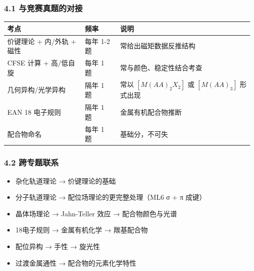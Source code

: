 \documentclass[a4paper,11pt]{ctexart}
\providecommand{\tightlist}{\setlength{\itemsep}{0pt}\setlength{\parskip}{0pt}}
\newcounter{none}
\begin{document}
\subsubsection{4.1 与竞赛真题的对接}\label{ux4e0eux7adeux8d5bux771fux9898ux7684ux5bf9ux63a5}

{\def\LTcaptype{none} %
\begin{longtable}[]{@{}
  >{\raggedright\arraybackslash}p{}
  >{\centering\arraybackslash}p{}
  >{\raggedright\arraybackslash}p{}@{}}
\toprule\noalign{}
\begin{minipage}[b]{\linewidth}\raggedright
考点
\end{minipage} & \begin{minipage}[b]{\linewidth}\centering
频率
\end{minipage} & \begin{minipage}[b]{\linewidth}\raggedright
说明
\end{minipage} \\
\midrule\noalign{}
\endhead
\bottomrule\noalign{}
\endlastfoot
价键理论 + 内/外轨 + 磁性 & 每年 1-2 题 & 常给出磁矩数据反推结构 \\
CFSE 计算 + 高/低自旋 & 每年 1 题 & 常与颜色、稳定性结合考查 \\
几何异构/光学异构 & 隔年 1 题 & 常以 \([M(AA)_2X_2]\) 或 \([M(AA)_3]\) 形式出现 \\
EAN 18 电子规则 & 隔年 1 题 & 金属有机配合物推断 \\
配合物命名 & 每年 1 题 & 基础分，不可失 \\
\end{longtable}
}

\subsubsection{4.2 跨专题联系}\label{ux8de8ux4e13ux9898ux8054ux7cfb}

\begin{itemize}
\tightlist
\item
  杂化轨道理论 → 价键理论的基础
\item
  分子轨道理论 → 配位场理论的更完整处理（ML6 σ + π 成键）
\item
  晶体场理论 → Jahn-Teller 效应 → 配合物颜色与光谱
\item
  18电子规则 → 金属有机化学 → 羰基配合物
\item
  配位异构 → 手性 → 旋光性
\item
  过渡金属通性 → 配合物的元素化学特性
\end{itemize}
\end{document}
